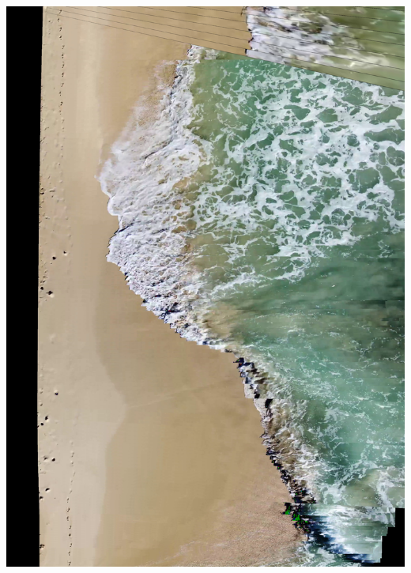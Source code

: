 \documentclass[12pt]{report}
\begin{document}
      \begin{minipage}{0.3\textwidth}
        \centering
        \includegraphics[width=\linewidth]{sea.mp4.jpg}
    \end{minipage}%
    \hfill
\end{document}
